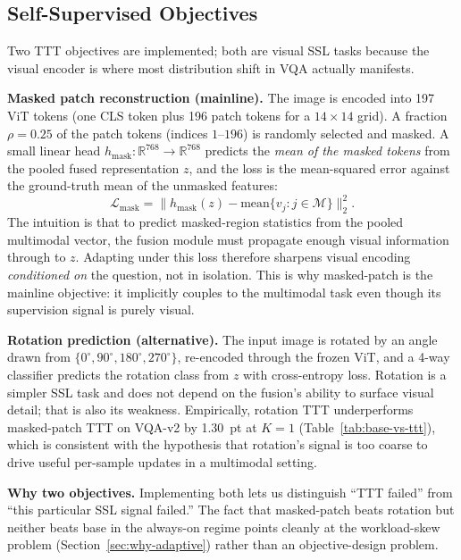 \documentclass[conference]{IEEEtran}
\begin{document}
\subsection{Self-Supervised Objectives}
\label{sec:ssl}

Two TTT objectives are implemented; both are visual SSL tasks because
the visual encoder is where most distribution shift in VQA actually
manifests.

\textbf{Masked patch reconstruction (mainline).} The image is encoded
into 197 ViT tokens (one CLS token plus 196 patch tokens for a
$14{\times}14$ grid). A fraction $\rho{=}0.25$ of the patch tokens
(indices $1$--$196$) is randomly selected and masked. A small linear
head $h_{\mathrm{mask}}: \mathbb{R}^{768} \to \mathbb{R}^{768}$ predicts
the \emph{mean of the masked tokens} from the pooled fused representation
$z$, and the loss is the mean-squared error against the ground-truth
mean of the unmasked features:
\begin{equation}
\mathcal{L}_{\mathrm{mask}} = \bigl\| h_{\mathrm{mask}}(z) -
\mathrm{mean}\bigl\{ v_j : j \in \mathcal{M} \bigr\} \bigr\|_2^2.
\end{equation}
The intuition is that to predict masked-region statistics from the
pooled multimodal vector, the fusion module must propagate enough
visual information through to $z$. Adapting under this loss therefore
sharpens visual encoding \emph{conditioned on} the question, not in
isolation. This is why masked-patch is the mainline objective: it
implicitly couples to the multimodal task even though its supervision
signal is purely visual.

\textbf{Rotation prediction (alternative).} The input image is rotated
by an angle drawn from $\{0^\circ, 90^\circ, 180^\circ, 270^\circ\}$,
re-encoded through the frozen ViT, and a 4-way classifier predicts the
rotation class from $z$ with cross-entropy loss. Rotation is a simpler
SSL task and does not depend on the fusion's ability to surface visual
detail; that is also its weakness. Empirically, rotation TTT
underperforms masked-patch TTT on VQA-v2 by 1.30~pt at $K{=}1$
(Table~\ref{tab:base-vs-ttt}), which is consistent with the hypothesis
that rotation's signal is too coarse to drive useful per-sample updates
in a multimodal setting.

\textbf{Why two objectives.} Implementing both lets us distinguish
``TTT failed'' from ``this particular SSL signal failed.'' The fact
that masked-patch beats rotation but neither beats base in the
always-on regime points cleanly at the workload-skew problem
(Section~\ref{sec:why-adaptive}) rather than an objective-design
problem.
\end{document}
